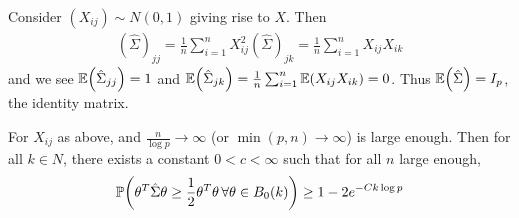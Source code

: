 Consider $(X_{ij}) \sim N(0, 1)$ giving rise to $X$.  Then
\begin{align}
  \label{eq:149}
  (\hat \Sigma)_{jj} = \frac{1}{n} \sum_{i=1}^{n} X_{ij}^{2}
  (\hat \Sigma)_{jk} = \frac{1}{n} \sum_{i=1}^{n} X_{ij} X_{ik}
\end{align} and we see $\E{\hat \Sigma_{jj}} = 1$ and $\E{\hat
  \Sigma_{jk}} = \frac{1}{n} \sum_{i=1}^{n} \E{X_{ij} X_{ik}} = 0$.
Thus $\E{\hat \Sigma} = I_{p}$, the identity matrix.

\begin{thm}
  \label{defn:high_dimensional_statistics:2}
  For $X_{ij}$ as above, and $\frac{n}{\log p} \rightarrow \infty$ (or
  $\min(p, n) \rightarrow \infty$) is large enough.  Then for all $k
  \in N$, there exists a constant $0 < c < \infty$ such that for all
  $n$ large enough,
  \begin{align}
    \label{eq:151}
    \Prob{\theta^{T} \hat \Sigma \theta \geq \frac{1}{2} \theta^{T}
      \theta \, \forall \theta \in B_{0}(k)} \geq 1 - 2e^{-Ck \log p}
  \end{align}
\end{thm}


